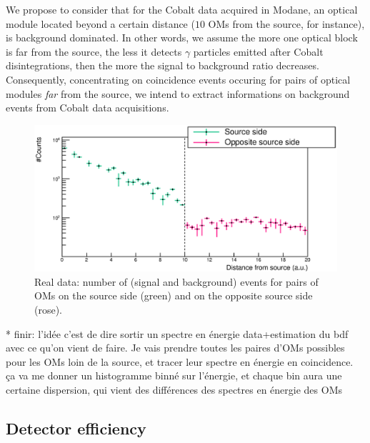 \newline
We propose to consider that for the Cobalt data acquired in Modane, an optical module located beyond a certain distance ($10$ OMs from the source, for instance), is background dominated.
In other words, we assume the more one optical block is far from the source, the less it detects $\gamma$ particles emitted after Cobalt disintegrations, then the more the signal to background ratio decreases.
Consequently, concentrating on coincidence events occuring for pairs of optical modules \emph{far} from the source, we intend to extract informations on background events from Cobalt data acquisitions.
\begin{figure}[h]
  \centering
  \includegraphics[width=17cm]{commissioning/fig_commissioning/Co_data_bkg.eps}
  \caption{Real data: number of (signal and background) events for pairs of OMs on the source side (green) and on the opposite source side (rose).
    \label{fig:Co_data_bkg}}
\end{figure}
\newline
* finir: l'idée c'est de dire sortir un spectre en énergie data+estimation du bdf avec ce qu'on vient de faire.
Je vais prendre toutes les paires d'OMs possibles pour les OMs loin de la source, et tracer leur spectre en énergie en coincidence.
ça va me donner un histogramme binné sur l'énergie, et chaque bin aura une certaine dispersion, qui vient des différences des spectres en énergie des OMs




\subsection{Detector efficiency}
\label{subsec:detector_efficiency}


